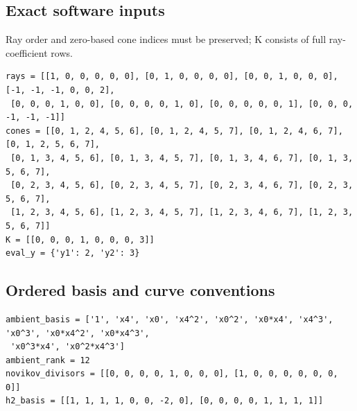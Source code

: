 \documentclass[10pt,a4paper]{article}
\begin{document}
\subsection*{Exact software inputs}
Ray order and zero-based cone indices must be preserved; K consists of full ray-coefficient rows.
\begin{lstlisting}
rays = [[1, 0, 0, 0, 0, 0], [0, 1, 0, 0, 0, 0], [0, 0, 1, 0, 0, 0], [-1, -1, -1, 0, 0, 2],
 [0, 0, 0, 1, 0, 0], [0, 0, 0, 0, 1, 0], [0, 0, 0, 0, 0, 1], [0, 0, 0, -1, -1, -1]]
cones = [[0, 1, 2, 4, 5, 6], [0, 1, 2, 4, 5, 7], [0, 1, 2, 4, 6, 7], [0, 1, 2, 5, 6, 7],
 [0, 1, 3, 4, 5, 6], [0, 1, 3, 4, 5, 7], [0, 1, 3, 4, 6, 7], [0, 1, 3, 5, 6, 7],
 [0, 2, 3, 4, 5, 6], [0, 2, 3, 4, 5, 7], [0, 2, 3, 4, 6, 7], [0, 2, 3, 5, 6, 7],
 [1, 2, 3, 4, 5, 6], [1, 2, 3, 4, 5, 7], [1, 2, 3, 4, 6, 7], [1, 2, 3, 5, 6, 7]]
K = [[0, 0, 0, 1, 0, 0, 0, 3]]
eval_y = {'y1': 2, 'y2': 3}
\end{lstlisting}
\subsection*{Ordered basis and curve conventions}
\begin{lstlisting}
ambient_basis = ['1', 'x4', 'x0', 'x4^2', 'x0^2', 'x0*x4', 'x4^3', 'x0^3', 'x0*x4^2', 'x0*x4^3',
 'x0^3*x4', 'x0^2*x4^3']
ambient_rank = 12
novikov_divisors = [[0, 0, 0, 0, 1, 0, 0, 0], [1, 0, 0, 0, 0, 0, 0, 0]]
h2_basis = [[1, 1, 1, 1, 0, 0, -2, 0], [0, 0, 0, 0, 1, 1, 1, 1]]
\end{lstlisting}
\end{document}
